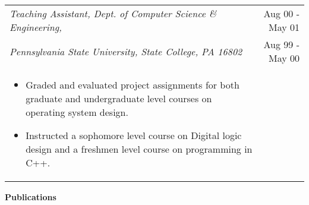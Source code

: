 \documentclass{article}
\begin{document}
\begin{center}
	
  	\normalsize
	\begin{tabularx}{6.2in}{Xr}
	\emph{Teaching Assistant, Dept. of Computer Science \& Engineering,} & Aug 00 - May 01	\\
	\emph{Pennsylvania State University, State College, PA 16802} & Aug 99 - May 00 \\
	\vspace*{-2pt}
	\begin{itemize}
	\small
	\item {Graded and evaluated project assignments for both graduate and undergraduate level courses on 
	operating system design.}
	\item {Instructed a sophomore level course on Digital logic design and a freshmen level course on 
	programming in C++.}
	\end{itemize}
	\end{tabularx}

  \end{center}


  \vspace*{-0.2truein}
  \large \textbf{Publications}
  \normalsize
  \vspace*{-0.2truein}
\end{document}
